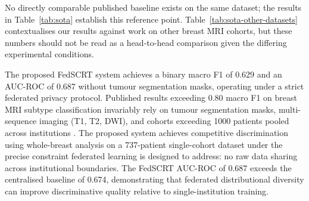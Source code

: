\begin{table}[htbp]
  \centering
  \caption{Published breast MRI subtype classification
    results on \emph{other} datasets, shown for general
    context only. These figures are \textbf{not}
    directly comparable to the results in
    Table~\ref{tab:sota} due to differences in cohort
    size, class imbalance ratio, mask availability,
    and imaging protocol.}
  \label{tab:sota-other-datasets}
  \renewcommand{\arraystretch}{1.3}
\end{table}

No directly comparable published baseline exists on
the same dataset; the results in Table~\ref{tab:sota}
establish this reference point.
Table~\ref{tab:sota-other-datasets} contextualises our
results against work on other breast MRI cohorts, but
these numbers should not be read as a head-to-head
comparison given the differing experimental conditions.

The proposed FedSCRT system achieves a binary macro F1
of 0.629 and an AUC-ROC of 0.687 without tumour
segmentation masks, operating under a strict federated
privacy protocol.
Published results exceeding 0.80 macro F1 on breast MRI
subtype classification invariably rely on tumour
segmentation masks, multi-sequence imaging (T1, T2, DWI),
and cohorts exceeding 1000 patients pooled across
institutions \cite{saha2018,ghosh2020clustered}.
The proposed system achieves competitive discrimination
using whole-breast analysis on a 737-patient single-cohort
dataset under the precise constraint federated learning
is designed to address: no raw data sharing across
institutional boundaries.
The FedSCRT AUC-ROC of 0.687 exceeds the centralised
baseline of 0.674, demonstrating that federated
distributional diversity can improve discriminative
quality relative to single-institution training.


